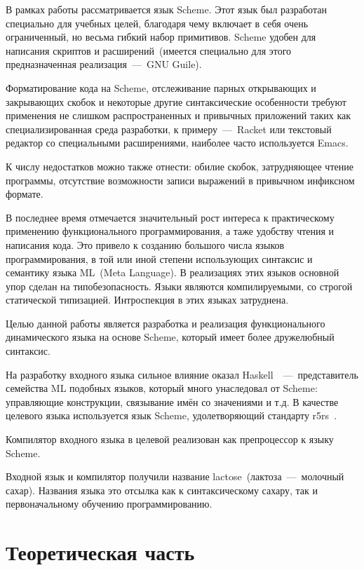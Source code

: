\documentclass[12pt,a4paper,oneside]{extarticle}
\begin{document}
    В рамках работы рассматривается язык Scheme.
    Этот язык был разработан специально для учебных целей, благодаря чему включает в себя очень ограниченный, но весьма гибкий набор примитивов.
    Scheme удобен для написания скриптов и расширений~(имеется специально для этого предназначенная реализация~---~GNU Guile).

    Форматирование кода на Scheme, отслеживание парных открывающих и закрывающих скобок и некоторые другие синтаксические особенности требуют применения не слишком распространенных и привычных приложений таких как специализированная среда разработки, к примеру~---~Racket или текстовый редактор со специальными расширениями, наиболее часто используется Emacs. 

    К числу недостатков можно также отнести: обилие скобок, затрудняющее чтение программы, отсутствие возможности записи выражений в привычном инфиксном формате.

    В последнее время отмечается значительный рост интереса к практическому применению функционального программирования, а таже удобству чтения и написания кода.
    Это привело к созданию большого числа языков программирования, в той или иной степени использующих синтаксис и семантику языка ML~(Meta Language).
    В реализациях этих языков основной упор сделан на типобезопасность.
    Языки являются компилируемыми, со строгой статической типизацией.
    Интроспекция в этих языках затруднена.

    Целью данной работы является разработка и реализация функционального динамического языка на основе Scheme, который имеет более дружелюбный синтаксис.

    На разработку входного языка сильное влияние оказал Haskell~\cite{haskell}~---~представитель семейства ML подобных языков, который много унаследовал от Scheme: управляющие конструкции, связывание имён со значениями и т.д.
    В качестве целевого языка используется язык Scheme, удолетворяющий стандарту r5rs~\cite{r5rs}.

    Компилятор входного языка в целевой реализован как препроцессор к языку Scheme.

    Входной язык и компилятор получили название lactose~(лактоза~---~молочный сахар).
    Названия языка это отсылка как к синтаксическому сахару, так и первоначальному обучению программированию.
\clearpage

\section{Теоретическая часть}
\end{document}
